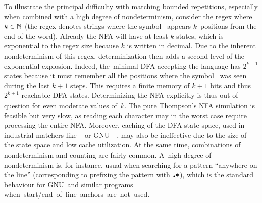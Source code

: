 \documentclass[acmsmall,screen]{acmart}
\begin{document}
To illustrate the principal difficulty with matching bounded repetitions,
especially when combined with a high degree of nondeterminism, 
consider the regex  where $k\in\mathbb{N}$ (the regex
denotes strings where the symbol~
appears $k$~positions from the end of the word).
Already the NFA will have at least $k$ states, which is exponential to the regex
size because $k$ is written in decimal. 
%
Due to the inherent nondeterminism of this regex, determinization then adds a second level of the exponential explosion.  
Indeed, the~minimal DFA accepting
the language has $2^{k+1}$ states because it must remember all the
positions where the symbol~ was seen during the last $k+1$ steps.  This
requires a finite memory of $k+1$ bits and thus $2^{k+1}$ reachable
DFA states. 
Determinizing the NFA explicitly is thus out of question for even moderate values
of~$k$. 
The pure Thompson's NFA simulation is feasible but very 
slow, as reading each character may in the
worst case require processing the entire NFA.
Moreover, caching of the DFA state space, used in industrial
matchers like
\retwo~\cite{re2} or GNU~\grep~\cite{grep},
may also be ineffective due to the size of the state space and
low cache utilization.
At the same time, combinations of nondeterminism and counting are
fairly common. A~high degree of nondeterminism is, for instance, usual when
searching for a pattern ``anywhere on the line'' (corresponding to prefixing the
pattern with $\regex{\DOT*}$), which is the standard behaviour for GNU~\grep and
similar programs \mbox{when start/end of line anchors are not used.}
\end{document}
